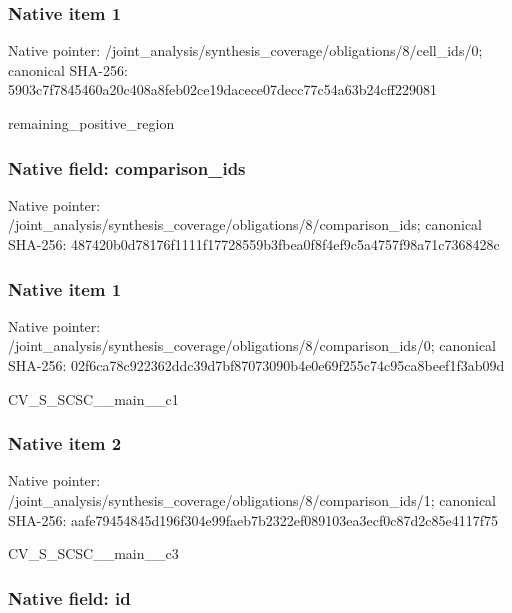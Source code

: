 \documentclass[10pt,a4paper]{article}
\begin{document}
\subsubsection{Native item 1}


Native pointer: /joint\_analysis/synthesi\allowbreak{}s\_coverage/obligations/8\allowbreak{}/cell\_ids/0; canonical SHA-256: 5903c7f7845460a20c408a8f\allowbreak{}eb02ce19dacece07decc77c5\allowbreak{}4a63b24cff229081


remaining\_positive\_region


\subsubsection{Native field: comparison\_ids}


Native pointer: /joint\_analysis/synthesi\allowbreak{}s\_coverage/obligations/8\allowbreak{}/comparison\_ids; canonical SHA-256: 487420b0d78176f1111f1772\allowbreak{}8559b3fbea0f8f4ef9c5a475\allowbreak{}7f98a71c7368428c



\subsubsection{Native item 1}


Native pointer: /joint\_analysis/synthesi\allowbreak{}s\_coverage/obligations/8\allowbreak{}/comparison\_ids/0; canonical SHA-256: 02f6ca78c922362ddc39d7bf\allowbreak{}87073090b4e0e69f255c74c9\allowbreak{}5ca8beef1f3ab09d


CV\_S\_SCSC\_\_main\_\_c1


\subsubsection{Native item 2}


Native pointer: /joint\_analysis/synthesi\allowbreak{}s\_coverage/obligations/8\allowbreak{}/comparison\_ids/1; canonical SHA-256: aafe79454845d196f304e99f\allowbreak{}aeb7b2322ef089103ea3ecf0\allowbreak{}c87d2c85e4117f75


CV\_S\_SCSC\_\_main\_\_c3


\subsubsection{Native field: id}
\end{document}
